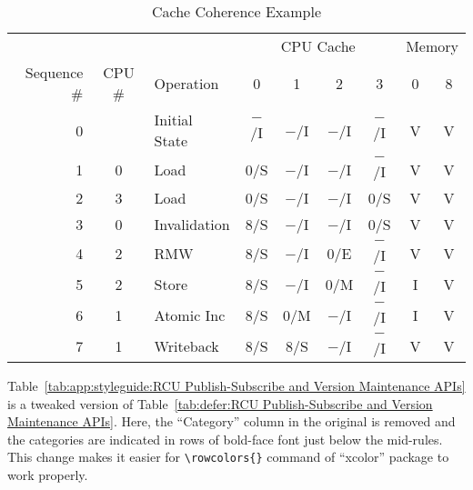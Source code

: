\begin{table*}[tbh]
\small
\centering
\renewcommand*{\arraystretch}{1.2}
%
\begin{tabular}{rclcccccc}
	\toprule
	& & & \multicolumn{4}{c}{CPU Cache} & \multicolumn{2}{c}{Memory} \\
	\cmidrule(lr){4-7} \cmidrule(l){8-9}
	Sequence \# & CPU \# & Operation & 0 & 1 & 2 & 3 & 0 & 8 \\
	\cmidrule(r){1-3} \cmidrule(lr){4-7} \cmidrule(l){8-9}
	0 &   & Initial State	& $-$/I & $-$/I & $-$/I & $-$/I   & V & V \\
	1 & 0 & Load		& 0/S &   $-$/I & $-$/I & $-$/I   & V & V \\
	2 & 3 & Load		& 0/S &   $-$/I & $-$/I & 0/S     & V & V \\
	3 & 0 & Invalidation	& 8/S &   $-$/I & $-$/I & 0/S     & V & V \\
	4 & 2 & RMW		& 8/S &   $-$/I & 0/E &   $-$/I   & V & V \\
	5 & 2 & Store		& 8/S &   $-$/I & 0/M &   $-$/I   & I & V \\
	6 & 1 & Atomic Inc	& 8/S &   0/M &   $-$/I & $-$/I   & I & V \\
	7 & 1 & Writeback	& 8/S &   8/S &   $-$/I & $-$/I   & V & V \\
	\bottomrule
\end{tabular}
\caption{Cache Coherence Example}
\label{tab:app:styleguide:Cache Coherence Example}
\end{table*}

Table~\ref{tab:app:styleguide:RCU Publish-Subscribe and Version Maintenance APIs}
is a tweaked version of
Table~\ref{tab:defer:RCU Publish-Subscribe and Version Maintenance APIs}.
Here, the ``Category'' column in the original is removed
and the categories are indicated in rows of bold-face font
just below the mid-rules. This change makes it easier for
\verb|\rowcolors{}| command of ``xcolor'' package to work
properly.

